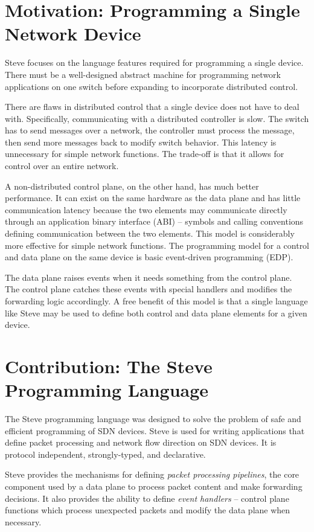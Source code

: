 \section{Motivation: Programming a Single Network Device}

Steve focuses on the language features required for programming a single device. There must be a well-designed abstract machine for programming network applications on one switch before expanding to incorporate distributed control.

There are flaws in distributed control that a single device does not have to deal with.
Specifically, communicating with a distributed controller is slow.
The switch has to send messages over a network, the controller must process the message, then send more messages back to modify switch behavior. This latency is unnecessary for simple network functions.
The trade-off is that it allows for control over an
entire network.

A non-distributed control plane, on the other hand, has much
better performance.
It can exist on the
same hardware as the data plane and has little communication latency
because the two elements may communicate directly through an application
binary interface (ABI) -- symbols and calling conventions defining communication between the two elements.
This model is considerably more effective for simple network functions.
The programming model for a control and data plane on the same device
is basic event-driven programming (EDP).

The data plane raises events when it needs something from the control plane.
The control plane catches these events with special handlers and modifies the
forwarding logic accordingly.
A free benefit of this model is that a single language like Steve may
be used to define both control and data plane elements for a given
device.

\section{Contribution: The Steve Programming Language}

The Steve programming language was designed to solve the problem of safe and efficient programming of SDN devices.
Steve is used for writing applications that define packet processing and network flow direction on SDN devices.
It is protocol independent, strongly-typed,
and declarative.

Steve provides the mechanisms for defining \emph{packet
processing pipelines}, the core component used by a data plane
to process packet content and make forwarding decisions.
It also provides the ability to define \emph{event handlers} --
control plane functions which process unexpected packets and
modify the data plane when necessary.

